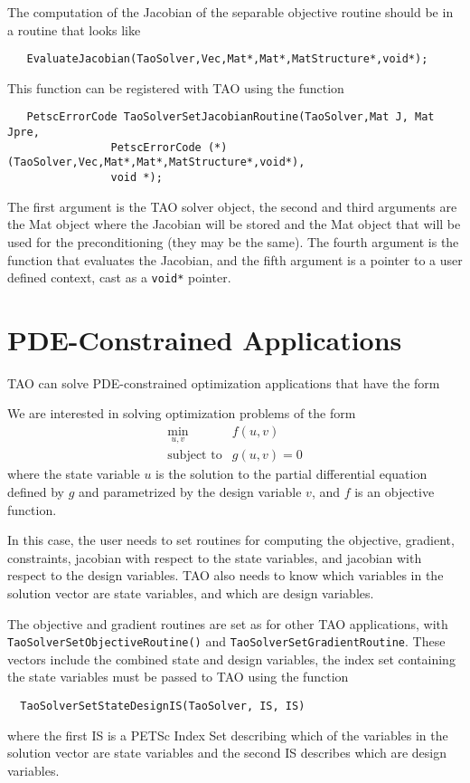 The computation of the Jacobian of the separable objective routine 
should be in a routine that looks like
\begin{verbatim}
   EvaluateJacobian(TaoSolver,Vec,Mat*,Mat*,MatStructure*,void*);
\end{verbatim}
This function can be registered with TAO using the function
\begin{verbatim}
   PetscErrorCode TaoSolverSetJacobianRoutine(TaoSolver,Mat J, Mat Jpre,
                PetscErrorCode (*)(TaoSolver,Vec,Mat*,Mat*,MatStructure*,void*),
                void *);
\end{verbatim}
The first argument is the TAO solver object, the second and third arguments
are the Mat object where the Jacobian will be stored and the Mat object
that will be used for the preconditioning (they may be the same). The fourth 
argument is the function that evaluates the Jacobian, 
and the fifth argument is a pointer to a user defined context,
cast as a {\tt void*} pointer.

\section{PDE-Constrained Applications}\label{sec:pde_applications}
TAO can solve PDE-constrained optimization applications 
that have the form

We are interested in solving optimization problems of the form
\[
\begin{array}{ll}
\displaystyle \min_{u,v} & f(u,v) \\
\mbox{subject to} & g(u,v) = 0
\end{array}
\]
where the state variable $u$ is the solution to the partial differential 
equation defined by $g$ and parametrized by the design variable $v$, and 
$f$ is an objective function.  


In this case, the user needs to set routines for computing the objective,
gradient, constraints, jacobian with respect to the state variables, 
and jacobian with
respect to the design variables.  TAO also needs to know which variables
in the solution vector are state variables, and which are design variables.

The objective and gradient routines are set as for other TAO applications,
with {\tt TaoSolverSetObjectiveRoutine()} and {\tt TaoSolverSetGradientRoutine}.
These vectors include the combined state and design variables, the index set
containing the state variables must be passed to TAO using the function
\begin{verbatim}
  TaoSolverSetStateDesignIS(TaoSolver, IS, IS)
\end{verbatim}
where the first IS is a PETSc Index Set describing which of the variables in the 
solution vector are state variables and the second IS describes which are
design variables.

